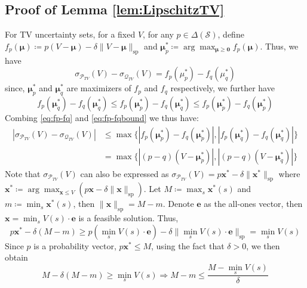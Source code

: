 \subsection{Proof of Lemma \ref{lem:LipschitzTV}} \label{proof:LipschitzTV}
    For TV uncertainty sets, for a fixed $V$, for any $p\in \Delta(\mathcal{S})$, define $f_p(\mathbf{\mu}) \coloneqq p(V-\mathbf{\mu}) - \delta\|V-\mathbf{\mu}\|_{\mathrm{sp}}$ and $\mathbf{\mu}_p^* \coloneqq \arg\max_{\mathbf{\mu} \geq \mathbf{0}}f_p(\mathbf{\mu})$. Thus, we have
    \begin{equation} \label{eq:fp-fq}
        \sigma_{\mathcal{P}_{TV}} (V) -  \sigma_{\mathcal{Q}_{TV}} (V) = f_p(\mu_p^*)- f_q(\mu_q^*) 
    \end{equation} 
    since, $\mathbf{\mu}_p^*$ and $\mathbf{\mu}_q^*$ are maximizers of $f_p$ and $f_q$ respectively, we further have
    \begin{equation} \label{eq:fp-fqbound}
     f_p(\mathbf{\mu}_q^*)- f_q(\mathbf{\mu}_q^*)  \leq f_p(\mathbf{\mu}_p^*)- f_q(\mathbf{\mu}_q^*) \leq f_p(\mathbf{\mu}_p^*)- f_q(\mathbf{\mu}_p^*)
    \end{equation}
    Combing \eqref{eq:fp-fq} and \eqref{eq:fp-fqbound} we thus have:
    \begin{align} \label{eq:maxpq}
        |\sigma_{\mathcal{P}_{TV}} (V) -  \sigma_{\mathcal{Q}_{TV}} (V)| &\leq \max\{|f_p(\mathbf{\mu}_p^*)- f_q(\mathbf{\mu}_p^*)|,|f_p(\mathbf{\mu}_q^*)- f_q(\mathbf{\mu}_q^*) | \} \nonumber \\
        &= \max\{|(p-q)(V-\mathbf{\mu}_p^*)|,|(p-q)(V-\mathbf{\mu}_q^*)| \} 
    \end{align}
    Note that $\sigma_{\mathcal{P}_{TV}} (V)$ can also be expressed as $\sigma_{\mathcal{P}_{TV}} (V) = p\mathbf{x}^*-\delta \|\mathbf{x}^*\|_{\mathrm{sp}}$ where $\mathbf{x}^* \coloneqq\arg\max_{\mathbf{x} \leq V}(p\mathbf{x}-\delta \|\mathbf{x}\|_{\mathrm{sp}})$. Let $M\coloneqq \max_s\mathbf{x}^*(s)$ and $m\coloneqq \min_s\mathbf{x}^*(s)$, then $\|\mathbf{x}\|_{\mathrm{sp}} = M-m$. Denote $\mathbf{e}$ as the all-ones vector, then $\mathbf{x}=\min_s V(s) \cdot \mathbf{e}$ is a feasible solution. Thus,
    \begin{equation}
        p\mathbf{x}^*-\delta (M-m) \geq p(\min_s V(s) \cdot \mathbf{e})-\delta \|\min_s V(s) \cdot \mathbf{e}\|_{\mathrm{sp}} = \min_s V(s)
    \end{equation}
    Since $p$ is a probability vector, $p\mathbf{x}^*\leq M$, using the fact that $\delta>0$, we then obtain
    \begin{equation} \label{eq:M-m}
        M-\delta (M-m) \geq \min_s V(s) \Rightarrow M-m \leq \frac{M-\min_s V(s)}{\delta}
    \end{equation}
